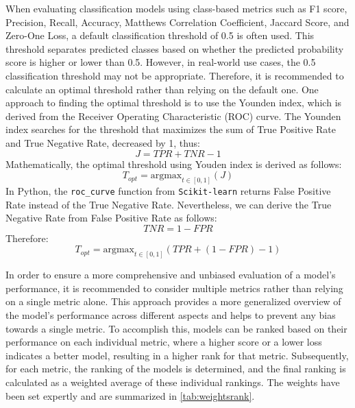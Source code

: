 When evaluating classification models using class-based metrics such as F1 score, Precision, Recall, Accuracy, Matthews Correlation Coefficient, Jaccard Score, and Zero-One Loss, a default classification threshold of 0.5 is often used. This threshold separates predicted classes based on whether the predicted probability score is higher or lower than 0.5.
However, in real-world use cases, the 0.5 classification threshold may not be appropriate. Therefore, it is recommended to calculate an optimal threshold rather than relying on the default one.
One approach to finding the optimal threshold is to use the Younden index, which is derived from the Receiver Operating Characteristic (ROC) curve. The Younden index searches for the threshold that maximizes the sum of True Positive Rate and True Negative Rate, decreased by 1, thus:
\begin{equation}\label{eq}
J = TPR + TNR - 1
\end{equation}
Mathematically, the optimal threshold using Youden index is derived as follows:
\begin{equation}\label{eq}
    T_{opt} = \text{argmax}_{t \in [0, 1]}\left(J\right)
\end{equation}
In Python, the \lstinline{roc_curve} function from \lstinline{Scikit-learn} returns False Positive Rate instead of the True Negative Rate. Nevertheless, we can derive the True Negative Rate from False Positive Rate as follows:
\begin{equation}\label{eq}
    TNR =  1-FPR
\end{equation}
Therefore:
\begin{equation}\label{eq}
    T_{opt} = \text{argmax}_{t \in [0, 1]}\left(TPR +  \left(1-FPR\right) - 1\right)
\end{equation}

In order to ensure a more comprehensive and unbiased evaluation of a model's performance, it is recommended to consider multiple metrics rather than relying on a single metric alone. This approach provides a more generalized overview of the model's performance across different aspects and helps to prevent any bias towards a single metric.
To accomplish this, models can be ranked based on their performance on each individual metric, where a higher score or a lower loss indicates a better model, resulting in a higher rank for that metric. Subsequently, for each metric, the ranking of the models is determined, and the final ranking is calculated as a weighted average of these individual rankings.
The weights have been set expertly and are summarized in \autoref{tab:weightsrank}.

